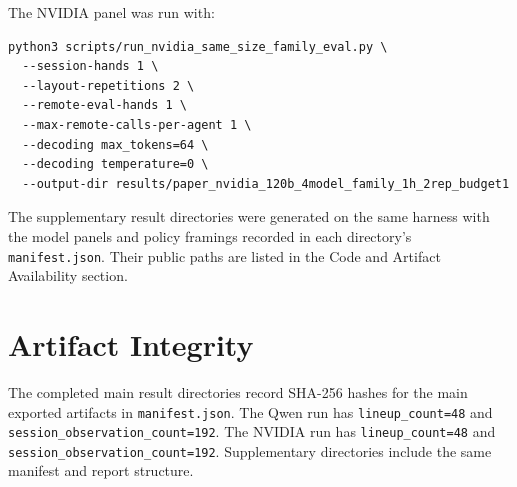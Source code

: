 \documentclass[11pt]{article}
\begin{document}
The NVIDIA panel was run with:
\begin{verbatim}
python3 scripts/run_nvidia_same_size_family_eval.py \
  --session-hands 1 \
  --layout-repetitions 2 \
  --remote-eval-hands 1 \
  --max-remote-calls-per-agent 1 \
  --decoding max_tokens=64 \
  --decoding temperature=0 \
  --output-dir results/paper_nvidia_120b_4model_family_1h_2rep_budget1
\end{verbatim}

The supplementary result directories were generated on the same harness with the model panels and policy framings recorded in each directory's \texttt{manifest.json}. Their public paths are listed in the Code and Artifact Availability section.

\section{Artifact Integrity}
The completed main result directories record SHA-256 hashes for the main exported artifacts in \texttt{manifest.json}. The Qwen run has \texttt{lineup\_count=48} and \texttt{session\_observation\_count=192}. The NVIDIA run has \texttt{lineup\_count=48} and \texttt{session\_observation\_count=192}. Supplementary directories include the same manifest and report structure.
\end{document}
